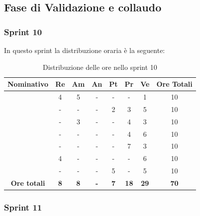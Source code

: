\subsection{Fase di Validazione e collaudo}

\subsubsection{Sprint 10}

In questo sprint la distribuzione oraria è la seguente:
\begin{table}[H]
		\begin{center}
			\setlength{\aboverulesep}{0pt}
			\setlength{\belowrulesep}{0pt}
			\setlength{\extrarowheight}{.75ex}
			\begin{tabular}{ c c c c c c c c }
				\rowcolor{AzzurroGruppo!30} 
				\textbf{Nominativo} & \textbf{Re} & \textbf{Am} & \textbf{An} & \textbf{Pt} & \textbf{Pr} & \textbf{Ve} & \textbf{Ore Totali}  \\
				\toprule
				\Davide    & 4 & 5 & - & - & - & 1 & 10 \\
				\Giosue    & - & - & - & 2 & 3 & 5 & 10 \\
				\Francesco & - & 3 & - & - & 4 & 3 & 10\\
				\Daniele   & - & - & - & - & 4 & 6 & 10\\
				\Lucrezia  & - & - & - & - & 7 & 3 & 10\\
				\Matteo    & 4 & - & - & - & - & 6 & 10\\
				\Tommaso   & - & - & - & 5 & - & 5 & 10\\
				 \textbf{Ore totali} & \textbf{8} & \textbf{8} & \textbf{-} & \textbf{7} & \textbf{18} & \textbf{29} & \textbf{70} \\
				\bottomrule
			\end{tabular}
			\caption{Distribuzione delle ore nello sprint 10}
		\end{center}
	\end{table}


\subsubsection{Sprint 11}


